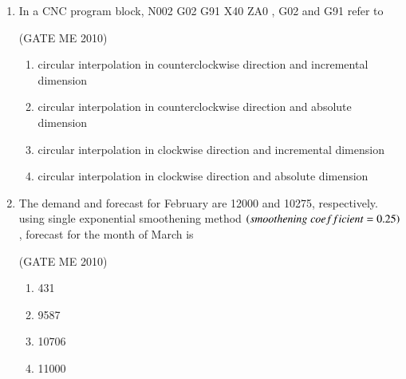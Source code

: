 \documentclass[journal,12pt,onecolumn]{IEEEtran}
\theoremstyle{remark}
\begin{document}
\begin{enumerate}
 \hfill{(GATE ME 2010)}\\

\begin{multicols}{2}
\begin{enumerate}

\item  -0.025, $\pm{0.08}$

\item  -0.025, 0.016

\item -0.009, $\pm{0.008}$

\item  -0.009, 0.016
 \end{enumerate}
\end{multicols}

\item In a CNC program block, N002 G02 G91 X40 ZA0  , G02 and G91 refer to

  \hfill{(GATE ME 2010)}\\
  
\begin{enumerate}

    \item circular interpolation in counterclockwise direction and incremental dimension
    \item  circular interpolation in counterclockwise direction and absolute dimension
    \item circular interpolation in clockwise direction and incremental dimension
    \item circular interpolation in clockwise direction and absolute dimension
    \end{enumerate}
 


\item The demand and forecast for February are 12000 and 10275, respectively. using single exponential smoothening method $\left(smoothening\;coefficient = 0.25\right)$, forecast for the month of March is

 \hfill{(GATE ME 2010)}\\
 
\begin{multicols}{4}
\begin{enumerate}

\item 431
\item 9587
\item 10706
\item 11000
 \end{enumerate}
\end{multicols}




\end{enumerate}
\end{document}
